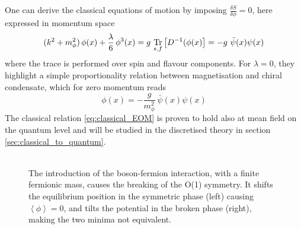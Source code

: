 One can derive the classical equations of motion by imposing $\frac{\delta S}{\delta \phi} = 0$, here expressed in momentum space
\begin{equation*}
     (k^2 + m_\phi^2) \, \phi(x) + \frac{\lambda}{6} \, \phi^3(x) = g \ \underset{s,f}{\tr} \left[D^{-1}(\phi(x)\right] = - g \ \bar\psi(x) \psi(x)
\end{equation*}
where the trace is performed over spin and flavour components. For $\lambda = 0$, they highlight a simple proportionality relation between magnetisation and chiral condensate, which for zero momentum reads
\begin{equation}
    \phi(x) = - \frac{g}{m_\phi^2} \ \bar \psi(x) \psi(x)
    \label{eq:classical_EOM}
\end{equation}
The classical relation \eqref{eq:classical_EOM} is proven to hold also at mean field on the quantum level \cite{Buballa2005NJL-modelMatter} and will be studied in the discretised theory in section \ref{sec:classical_to_quantum}. \\~\\


\begin{figure}[h]
\centering
\begin{minipage}{0.45\textwidth}
    
\end{minipage}
\hfill
\begin{minipage}{0.45\textwidth}
\end{minipage}
\label{fig:breaking_O1_symmetry}
\caption{The introduction of the boson-fermion interaction, with a finite fermionic mass, causes the breaking of the O(1) symmetry. It shifts the equilibrium position in the symmetric phase (left) causing $\left\langle \phi \right\rangle = 0$, and tilts the potential in the broken phase (right), making the two minima not equivalent.}
\end{figure}


